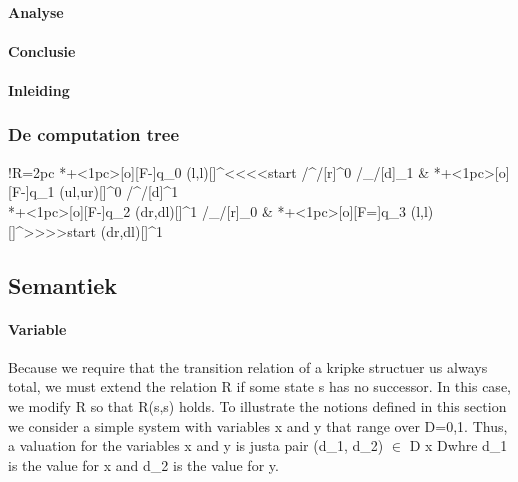 

\paragraph{Analyse}
\paragraph{Conclusie}

 


\paragraph{Inleiding}






	\subsubsection{De computation tree}

\xymatrix@ur@!R=2pc{%
	*+<1pc>[o][F-]{q_0}  \ar@(l,l)[]^<<<<{start} \ar@/^/[r]^0  \ar@/_/[d]_1 
	& *+<1pc>[o][F-]{q_1} \ar@(ul,ur)[]^{0}  \ar@/^/[d]^1 \\
	*+<1pc>[o][F-]{q_2} \ar@(dr,dl)[]^{1} \ar@/_/[r]_0 
	& *+<1pc>[o][F=]{q_3} \ar@(l,l)[]^>>>>{start}  \ar@(dr,dl)[]^{1} \\
 
 }








\subsection{Semantiek}




\paragraph{Variable}



Because we require that the transition relation of a kripke structuer us always total, we must extend the relation R if some state s has no successor. In this case, we modify R so that R(s,s) holds.
To illustrate the notions defined in this section we consider a simple system with variables x and y that range over D={0,1}. Thus, a valuation for the variables x and y is justa pair (d_1, d_2) $\in$ D x Dwhre d_1 is the value for x and d_2 is the value for y.



